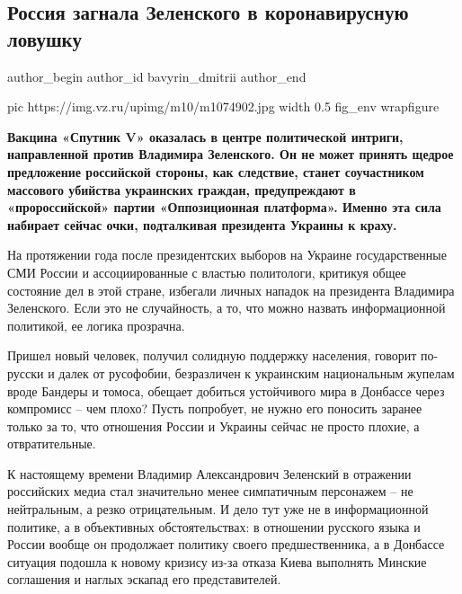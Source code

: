  
 
 
 
 
 
\subsection{Россия загнала Зеленского в коронавирусную ловушку}
\label{sec:10_12_2020.news.ru.vz.bavyrin_dmitrii.1.russia_ukraina_koronavirus_lovushka}
\ifcmt
	author_begin
   author_id bavyrin_dmitrii
	author_end
\fi

\ifcmt
  pic https://img.vz.ru/upimg/m10/m1074902.jpg
  width 0.5
  fig_env wrapfigure
\fi

\textbf{Вакцина «Спутник V» оказалась в центре политической интриги, направленной
против Владимира Зеленского. Он не может принять щедрое предложение российской
стороны, как следствие, станет соучастником массового убийства украинских
граждан, предупреждают в «пророссийской» партии «Оппозиционная платформа».
Именно эта сила набирает сейчас очки, подталкивая президента Украины к краху.}

На протяжении года после президентских выборов на Украине государственные СМИ
России и ассоциированные с властью политологи, критикуя общее состояние дел в
этой стране, избегали личных нападок на президента Владимира Зеленского. Если
это не случайность, а то, что можно назвать информационной политикой, ее логика
прозрачна.

Пришел новый человек, получил солидную поддержку населения, говорит по-русски и
далек от русофобии, безразличен к украинским национальным жупелам вроде Бандеры
и томоса, обещает добиться устойчивого мира в Донбассе через компромисс – чем
плохо? Пусть попробует, не нужно его поносить заранее только за то, что
отношения России и Украины сейчас не просто плохие, а отвратительные. 

К настоящему времени Владимир Александрович Зеленский в отражении российских
медиа стал значительно менее симпатичным персонажем – не нейтральным, а резко
отрицательным. И дело тут уже не в информационной политике, а в объективных
обстоятельствах: в отношении русского языка и России вообще он продолжает
политику своего предшественника, а в Донбассе ситуация подошла к новому кризису
из-за отказа Киева выполнять Минские соглашения и наглых эскапад его
представителей.

